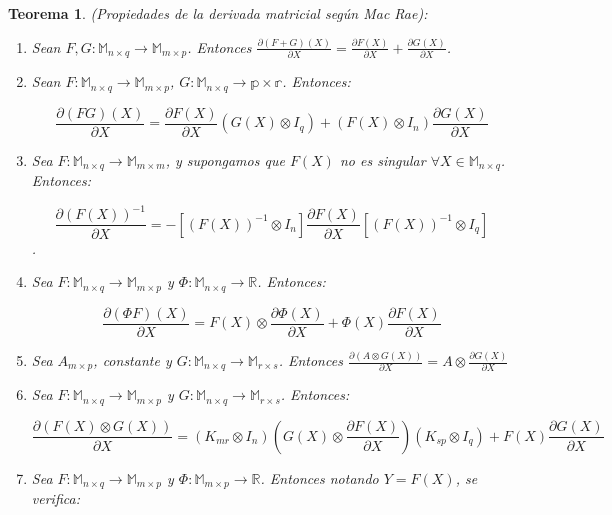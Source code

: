 \documentclass{article}
\theoremstyle{theorem-style}  %
\newtheorem{theorem}{Teorema}[section]  %
\theoremstyle{definition-style}
\theoremstyle{example-style}
\theoremstyle{exercise-style}
\begin{document}
	\begin{theorem}
		(Propiedades de la derivada matricial según Mac Rae):
		
		\begin{enumerate}
			\item Sean $F,G: \mathbb{M}_{n \times q} \rightarrow \mathbb{M}_{m \times p}$. Entonces $\frac{\partial (F+G)(X)}{\partial X} = \frac{\partial F(X)}{\partial X} + \frac{\partial G(X)}{\partial X}$.   
			
			\item Sean $F: \mathbb{M}_{n \times q} \rightarrow \mathbb{M}_{m \times p}$, $G: \mathbb{M}_{n \times q} \rightarrow \mathbb{p \times r} $. Entonces:
			
			$$ \frac{\partial (FG)(X)}{\partial X} = \frac{\partial F(X)}{\partial X} (G(X) \otimes I_q) + (F(X) \otimes I_n) \frac{\partial G(X)}{\partial X} $$
			
			\item Sea $F: \mathbb{M}_{n \times q} \rightarrow \mathbb{M}_{m \times m}$, y supongamos que $F(X)$ no es singular $\forall X \in \mathbb{M}_{n\times q}$. Entonces:
			
			$$ \frac{\partial (F(X))^{-1}}{\partial X} = -[(F(X))^{-1} \otimes I_n ]\frac{\partial F(X)}{\partial X}[(F(X))^{-1} \otimes I_q ]$$. 
			
			\item Sea $F: \mathbb{M}_{n \times q} \rightarrow \mathbb{M}_{m \times p}$ y $\Phi: \mathbb{M}_{n \times q} \rightarrow \mathbb{R}$. Entonces:
			
			$$ \frac{\partial (\Phi F)(X)}{\partial X} = F(X) \otimes \frac{\partial \Phi(X)}{\partial X} + \Phi(X)\frac{\partial F(X)}{\partial X} $$
			
			\item Sea $A_{m \times p}$, constante y $G: \mathbb{M}_{n \times q} \rightarrow \mathbb{M}_{r \times s}$. Entonces $ \frac{\partial (A \otimes G(X))}{\partial X} = A \otimes \frac{\partial G(X)}{\partial X}$
			
			\item Sea $F: \mathbb{M}_{n \times q} \rightarrow \mathbb{M}_{m \times p}$ y $G: \mathbb{M}_{n \times q} \rightarrow \mathbb{M}_{r \times s}$. Entonces:
			
			$$ \frac{\partial(F(X) \otimes G(X))}{\partial X} = (K_{mr} \otimes I_n)(G(X) \otimes \frac{\partial F(X)}{\partial X})(K_{sp} \otimes I_q) + F(X)\frac{\partial G(X)}{\partial X} $$
			
			\item Sea $F: \mathbb{M}_{n \times q} \rightarrow \mathbb{M}_{m \times p}$ y $\Phi: \mathbb{M}_{m \times p} \rightarrow \mathbb{R}$. Entonces notando $Y=F(X)$, se verifica:
			

\end{enumerate}
\end{theorem}
\end{document}
